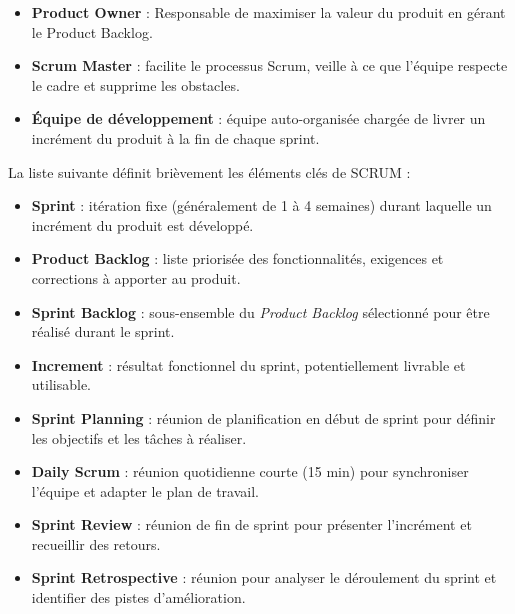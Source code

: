 \documentclass[12pt,a4paper]{report}
\begin{document}
	\begin{itemize}
		
		\item \textbf{Product Owner} : Responsable de maximiser la valeur du produit en gérant le Product Backlog.
		
		\item \textbf{Scrum Master} : facilite le processus Scrum, veille à ce que l’équipe respecte le cadre et supprime les obstacles.
		
		\item \textbf{Équipe de développement} : équipe auto-organisée chargée de livrer un incrément du produit à la fin de chaque sprint.
		
	\end{itemize}
	
	La liste suivante définit brièvement les éléments clés de SCRUM :
	
	\begin{itemize}
		
		\item \textbf{Sprint} : itération fixe (généralement de 1 à 4 semaines) durant laquelle un incrément du produit est développé.
		
		\item \textbf{Product Backlog} : liste priorisée des fonctionnalités, exigences et corrections à apporter au produit.
		
		\item \textbf{Sprint Backlog} : sous-ensemble du \textit{Product Backlog} sélectionné pour être réalisé durant le sprint.
		
		\item \textbf{Increment} : résultat fonctionnel du sprint, potentiellement livrable et utilisable.
		
		\item \textbf{Sprint Planning} : réunion de planification en début de sprint pour définir les objectifs et les tâches à réaliser.
		
		\item \textbf{Daily Scrum} : réunion quotidienne courte (15 min) pour synchroniser l’équipe et adapter le plan de travail.
		
		\item \textbf{Sprint Review} : réunion de fin de sprint pour présenter l’incrément et recueillir des retours.
		
		\item \textbf{Sprint Retrospective} : réunion pour analyser le déroulement du sprint et identifier des pistes d’amélioration.
	\end{itemize}
	
\end{document}
